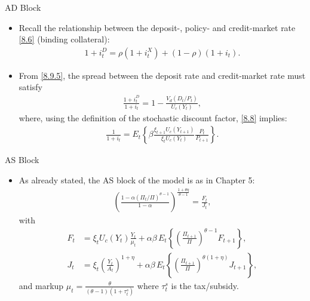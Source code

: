 \documentclass[11pt,aspectratio=169]{beamer}
\begin{document}
\begin{frame}{AD Block}
  \begin{itemize}
    \item Recall the relationship between the deposit-, policy- and credit-market rate \eqref{8.6} (binding collateral):
    \begin{align}
    1+i_t^D
      = \rho(1+i_t^X) + (1-\rho)(1+i_t). \label{8.11}
    \end{align}
    \item From \eqref{8.9.5}, the spread between the deposit rate and credit-market rate must satisfy 
    \begin{align}
         \frac{1+i_t^D}{1+i_t}
      = 1 - \frac{V_d(D_t/P_t)}{U_c(Y_t)}, \label{8.12}
    \end{align} where, using the definition of the stochastic discount factor, \eqref{8.8} implies: 
    \begin{align}
          \frac{1}{1+i_t}
      = E_t\left\{
         \beta\frac{\xi_{t+1}U_c(Y_{t+1})}{\xi_t U_c(Y_t)}\frac{P_t}{P_{t+1}}
        \right\}. \label{8.13}
    \end{align}
  \end{itemize}
\end{frame}

\begin{frame}{AS Block}
  \begin{itemize}
    \item As already stated, the AS block of the model is as in Chapter 5: 
    \begin{align}
        \left(
        \frac{1-\alpha(\Pi_t/\Pi)^{\theta-1}}
             {1-\alpha}
      \right)^{\frac{1+\theta\eta}{\theta-1}}
      = \frac{F_t}{J_t}, \label{8.14}
    \end{align}
    with
    \begin{align}
        F_t
      &= \xi_t U_c(Y_t)\frac{Y_t}{\mu_t}
        + \alpha\beta\,E_t\left\{
           \left(\frac{\Pi_{t+1}}{\Pi}\right)^{\theta-1} F_{t+1}
        \right\}, \label{8.15} \\
        J_t
      &= \xi_t\left(\frac{Y_t}{A_t}\right)^{1+\eta}
        + \alpha\beta\,E_t\left\{
           \left(\frac{\Pi_{t+1}}{\Pi}\right)^{\theta(1+\eta)} J_{t+1}
        \right\}, \label{8.16}
    \end{align} and markup $\mu_t = \frac{\theta}{(\theta -1)(1 + \tau_t^s)}$ where $\tau_t^s$ is the tax/subsidy. 
  \end{itemize}
\end{frame}
\end{document}
